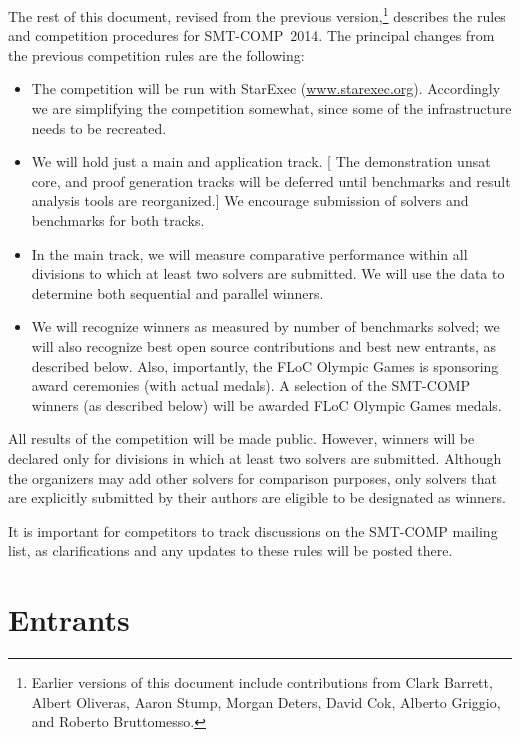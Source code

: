 \documentclass[12pt]{article}
\begin{document}
The rest of this document, revised from the previous 
version,\footnote{Earlier versions of this document include contributions from
Clark Barrett, Albert Oliveras, Aaron Stump, Morgan Deters, David Cok, Alberto Griggio, and Roberto Bruttomesso.}
describes the rules and competition procedures for SMT-COMP~2014.
The principal changes from the previous competition rules are the following:
\begin{itemize}
\item The competition will be run with StarExec (\url{www.starexec.org}). Accordingly we are simplifying the competition somewhat, since some of the infrastructure needs to be recreated.
\item We will hold just a main and application track. [ The demonstration unsat core, and proof generation tracks will be deferred until benchmarks and result analysis tools are reorganized.] We encourage submission of solvers and benchmarks for both tracks.
\item In the main track, we will measure comparative performance within all divisions to which at least two solvers are submitted. We will use the data to determine both sequential and parallel winners.

\item We will recognize winners as measured by number of benchmarks solved; we will also recognize best open source contributions and best new entrants, as described below. 
Also, importantly, the FLoC Olympic Games is sponsoring award ceremonies (with actual medals). A selection of the SMT-COMP winners (as described below) will be awarded FLoC Olympic Games medals.

\end{itemize}

All results of the competition will be made public. However, 
winners will be declared only for divisions in which at least two solvers are submitted.
Although the organizers may add other solvers for comparison purposes, only solvers that
are explicitly submitted by their authors are eligible to be designated as winners.

It is important for competitors to track discussions on the SMT-COMP mailing
list, as clarifications and any updates to these rules will be posted there.

\section{Entrants}
\label{sec:entrants}
\end{document}
